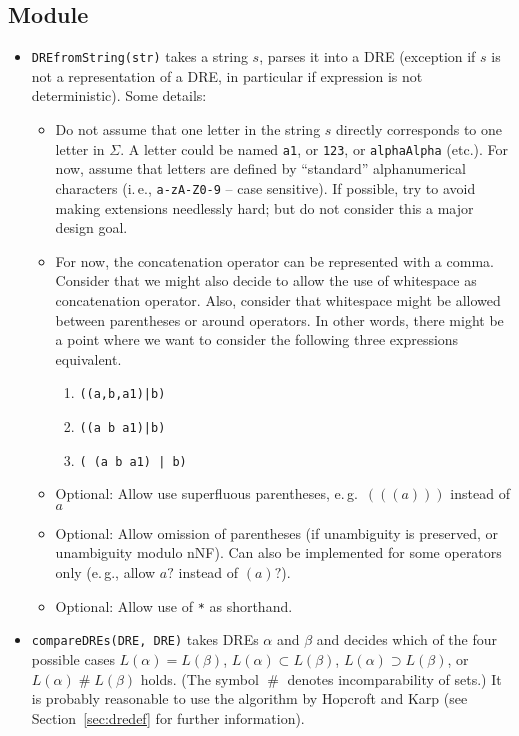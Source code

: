 \documentclass[a4paper,11pt, svgnames,titlepage]{article}
\DeclareMathOperator{\incomp}{\#}
\begin{document}
\subsection{Module}\label{sec:des:mod}
\begin{itemize}
	\item\texttt{DREfromString(str)} takes a string $s$, parses it into a DRE (exception if $s$ is not a representation of a DRE, in particular if expression is not deterministic). Some details:
	\begin{itemize}
		\item Do not assume that one letter in the string $s$ directly corresponds to one letter in $\Sigma$. A letter could be named \texttt{a1}, or \texttt{123}, or \texttt{alphaAlpha} (etc.). For now, assume that letters are defined by ``standard'' alphanumerical characters (i.\,e., \texttt{a-zA-Z0-9} -- case sensitive). If possible, try to avoid making extensions needlessly hard; but do not consider this a major design goal.
		\item For now, the concatenation operator can be represented with a comma. Consider that we might also decide to allow the use of whitespace as concatenation operator. Also, consider that whitespace might be allowed between parentheses or around operators. In other words, there might be a point where we want to consider the following three expressions equivalent. \begin{enumerate}
			\item \texttt{((a,b,a1)|b)}
			\item \texttt{((a b a1)|b)}
			\item \texttt{( (a b a1) | b)}
		\end{enumerate} 
		\item Optional: Allow use superfluous parentheses, e.\,g.\ $(((a)))$ instead of $a$
		\item Optional: Allow omission of parentheses (if unambiguity is preserved, or unambiguity modulo nNF). Can also be implemented for some operators only (e.\,g., allow $a?$ instead of $(a)?$).
		\item Optional: Allow use of \texttt{*} as shorthand. 
	\end{itemize}
		\item\texttt{compareDREs(DRE, DRE)}  takes DREs $\alpha$ and $\beta$ and decides which of the four possible cases $L(\alpha)=L(\beta)$, $L(\alpha)\subset L(\beta)$, $L(\alpha)\supset L(\beta)$, or $L(\alpha)\incomp L(\beta)$ holds. (The symbol $\incomp$ denotes incomparability of sets.)  It is probably reasonable to use the algorithm by Hopcroft and Karp (see Section~\ref{sec:dredef} for further information).
\end{itemize}
\end{document}
